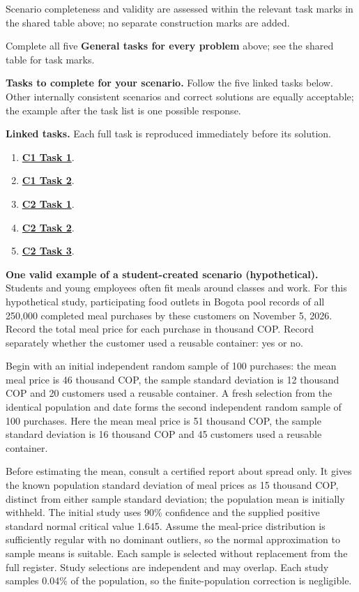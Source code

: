 Scenario completeness and validity are assessed within the relevant task marks in the shared table above; no separate construction marks are added.

Complete all five \textbf{General tasks for every problem} above; see the shared table for task marks.

\textbf{Tasks to complete for your scenario.} Follow the five linked tasks below. Other internally consistent scenarios and correct solutions are equally acceptable; the example after the task list is one possible response.

\clearpage
\textbf{Linked tasks.} Each full task is reproduced immediately before its solution.

\begin{enumerate}[label=(\alph*),itemsep=6pt]
\item \hyperref[sol:p3c1a]{\textbf{C1 Task 1}}. \cOneA\ 
\item \hyperref[sol:p3c1b]{\textbf{C1 Task 2}}. \cOneB\ 
\item \hyperref[sol:p3c2a]{\textbf{C2 Task 1}}. \cTwoA\ 
\item \hyperref[sol:p3c2b]{\textbf{C2 Task 2}}. \cTwoB\ 
\item \hyperref[sol:p3c2c]{\textbf{C2 Task 3}}. \cTwoC\ 
\end{enumerate}
\secInicio[][sec:p3]

\clearpage

\textbf{One valid example of a student-created scenario (hypothetical).}
Students and young employees often fit meals around classes and work. For this hypothetical study, participating food outlets in Bogota pool records of all 250,000 completed meal purchases by these customers on November 5, 2026. Record the total meal price for each purchase in thousand COP. Record separately whether the customer used a reusable container: yes or no.

Begin with an initial independent random sample of 100 purchases: the mean meal price is 46 thousand COP, the sample standard deviation is 12 thousand COP and 20 customers used a reusable container. A fresh selection from the identical population and date forms the second independent random sample of 100 purchases. Here the mean meal price is 51 thousand COP, the sample standard deviation is 16 thousand COP and 45 customers used a reusable container.

Before estimating the mean, consult a certified report about spread only. It gives the known population standard deviation of meal prices as 15 thousand COP, distinct from either sample standard deviation; the population mean is initially withheld. The initial study uses 90\% confidence and the supplied positive standard normal critical value 1.645. Assume the meal-price distribution is sufficiently regular with no dominant outliers, so the normal approximation to sample means is suitable. Each sample is selected without replacement from the full register. Study selections are independent and may overlap. Each study samples 0.04\% of the population, so the finite-population correction is negligible.

